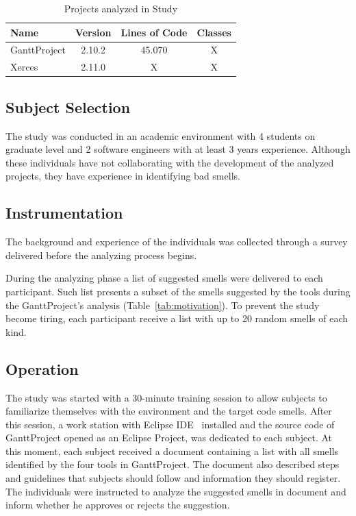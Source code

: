 \documentclass[conference]{IEEEtran}
\begin{document}
\begin{table}[ht]
\centering
\caption{Projects analyzed in Study}
\label{tab:study}
\begin{tabular}{lccc}
\hline
Name         & \multicolumn{1}{l}{Version} & \multicolumn{1}{l}{Lines of Code} & \multicolumn{1}{l}{Classes} \\ \hline
GanttProject & 2.10.2                       & 45.070                             & X                            \\ 
Xerces       & 2.11.0                       & X                                  & X                            \\ \hline
\end{tabular}
\end{table}


\subsection{Subject Selection}
\label{sec:subjects}

The study was conducted in an academic environment with 4 students on graduate level and 2 software engineers with at least 3 years experience. Although these individuals have not collaborating with the development of the analyzed projects, they have experience in identifying bad smells.

\subsection{Instrumentation}
\label{sec:instrumentation}

The background and experience of the individuals was collected through a survey delivered before the analyzing process begins. 

During the analyzing phase a list of suggested smells were delivered to each participant. Such list presents a subset of the smells suggested by the tools during the GanttProject's analysis (Table~\ref{tab:motivation}). To prevent the study become tiring, each participant receive a list with up to 20 random smells of each kind. 


\subsection{Operation}
\label{sec:operation}

The study was started with a 30-minute training session to allow subjects to familiarize themselves with the environment and the target code smells. After this session, a work station with Eclipse IDE~\cite{Eclipse} installed and the source code of GanttProject opened as an Eclipse Project, was dedicated to each subject. At this moment, each subject received a document containing a list with all smells identified by the four tools in GanttProject. The document also described steps and guidelines that subjects should follow and information they should register. The individuals were instructed to analyze the suggested smells in document and inform whether he approves or rejects the suggestion.
\end{document}

